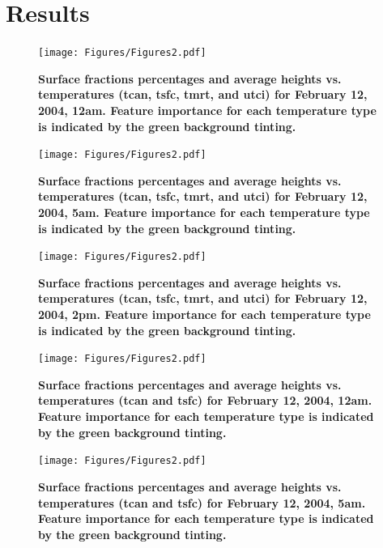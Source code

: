 \documentclass[final,3p,times,authoryear]{elsarticle}
\begin{document}
\section{Results}\label{sec:results}




\begin{figure}
\centering
\texttt{[image: Figures/Figures2.pdf]}
\caption{\bf Surface fractions percentages and average heights vs. temperatures (\gls{tcan}, \gls{tsfc}, \gls{tmrt}, and \gls{utci}) for February 12, 2004, 12am. Feature importance for each temperature type is indicated by the green background tinting.}
 \label{fig:box0}
\end{figure} 

\begin{figure}
\centering
\texttt{[image: Figures/Figures2.pdf]}
\caption{\bf Surface fractions percentages and average heights vs. temperatures (\gls{tcan}, \gls{tsfc}, \gls{tmrt}, and \gls{utci}) for February 12, 2004, 5am. Feature importance for each temperature type is indicated by the green background tinting.}
 \label{fig:box5}
\end{figure} 

\begin{figure}
\centering
\texttt{[image: Figures/Figures2.pdf]}
\caption{\bf Surface fractions percentages and average heights vs. temperatures (\gls{tcan}, \gls{tsfc}, \gls{tmrt}, and \gls{utci}) for February 12, 2004, 2pm. Feature importance for each temperature type is indicated by the green background tinting.}
 \label{fig:box14}
\end{figure} 


\begin{figure}
\centering
\texttt{[image: Figures/Figures2.pdf]}
\caption{\bf Surface fractions percentages and average heights vs. temperatures (\gls{tcan} and \gls{tsfc}) for February 12, 2004, 12am. Feature importance for each temperature type is indicated by the green background tinting.}
 \label{fig:box0a}
\end{figure} 

\begin{figure}
\centering
\texttt{[image: Figures/Figures2.pdf]}
\caption{\bf Surface fractions percentages and average heights vs. temperatures (\gls{tcan} and \gls{tsfc}) for February 12, 2004, 5am. Feature importance for each temperature type is indicated by the green background tinting.}
 \label{fig:box5a}
\end{figure} 
\end{document}
